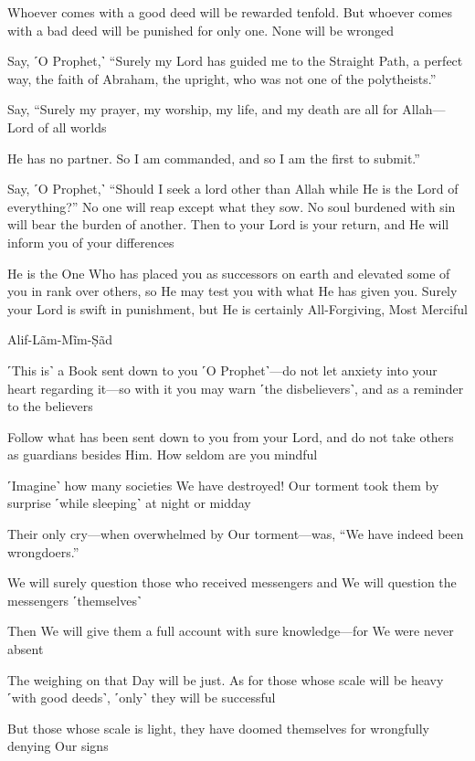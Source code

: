 Whoever comes with a good deed will be rewarded tenfold. But whoever comes with a bad deed will be punished for only one. None will be wronged

Say, ˹O Prophet,˺ “Surely my Lord has guided me to the Straight Path, a perfect way, the faith of Abraham, the upright, who was not one of the polytheists.”

Say, “Surely my prayer, my worship, my life, and my death are all for Allah—Lord of all worlds

He has no partner. So I am commanded, and so I am the first to submit.”

Say, ˹O Prophet,˺ “Should I seek a lord other than Allah while He is the Lord of everything?” No one will reap except what they sow. No soul burdened with sin will bear the burden of another. Then to your Lord is your return, and He will inform you of your differences

He is the One Who has placed you as successors on earth and elevated some of you in rank over others, so He may test you with what He has given you. Surely your Lord is swift in punishment, but He is certainly All-Forgiving, Most Merciful

Alif-Lãm-Mĩm-Ṣãd

˹This is˺ a Book sent down to you ˹O Prophet˺—do not let anxiety into your heart regarding it—so with it you may warn ˹the disbelievers˺, and as a reminder to the believers

Follow what has been sent down to you from your Lord, and do not take others as guardians besides Him. How seldom are you mindful

˹Imagine˺ how many societies We have destroyed! Our torment took them by surprise ˹while sleeping˺ at night or midday

Their only cry—when overwhelmed by Our torment—was, “We have indeed been wrongdoers.”

We will surely question those who received messengers and We will question the messengers ˹themselves˺

Then We will give them a full account with sure knowledge—for We were never absent

The weighing on that Day will be just. As for those whose scale will be heavy ˹with good deeds˺, ˹only˺ they will be successful

But those whose scale is light, they have doomed themselves for wrongfully denying Our signs

